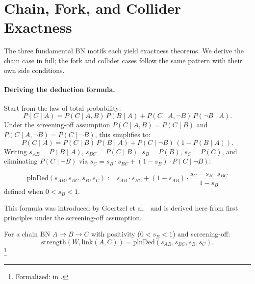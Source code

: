 \documentclass[11pt,openany]{report}
\begin{document}
\section{Chain, Fork, and Collider Exactness}

The three fundamental BN motifs each yield exactness theorems.
We derive the chain case in full; the fork and collider cases
follow the same pattern with their own side conditions.

\paragraph{Deriving the deduction formula.}
Start from the law of total probability:
\[
  P(C \mid A) = P(C \mid A, B)\,P(B \mid A)
              + P(C \mid A, \neg B)\,P(\neg B \mid A).
\]
Under the screening-off assumption $P(C \mid A, B) = P(C \mid B)$
and $P(C \mid A, \neg B) = P(C \mid \neg B)$, this simplifies to:
\[
  P(C \mid A) = P(C \mid B)\,P(B \mid A)
              + P(C \mid \neg B)\,(1 - P(B \mid A)).
\]
Writing $s_{AB} = P(B \mid A)$, $s_{BC} = P(C \mid B)$,
$s_B = P(B)$, $s_C = P(C)$, and eliminating $P(C \mid \neg B)$
via $s_C = s_B \cdot s_{BC} + (1 - s_B) \cdot P(C \mid \neg B)$:

\begin{definition}
\label{def:deduction-strength}
\[
  \mathrm{plnDed}(s_{AB}, s_{BC}, s_B, s_C) :=
  s_{AB} \cdot s_{BC}
  + (1 - s_{AB}) \cdot \frac{s_C - s_B \cdot s_{BC}}{1 - s_B}
\]
defined when $0 < s_B < 1$.
\end{definition}

\noindent
This formula was introduced by Goertzel et
al.~\cite{goertzel2009pln} and is derived here from first principles
under the screening-off assumption.

\begin{theorem}
\label{thm:chain-deduction}
For a chain BN $A \to B \to C$ with positivity ($0 < s_B < 1$) and
screening-off:
\[
  \mathrm{strength}(W, \mathrm{link}(A, C)) =
  \mathrm{plnDed}(s_{AB}, s_{BC}, s_B, s_C).
\]%
\footnote{Formalized: 
in .}
\end{theorem}
\end{document}
